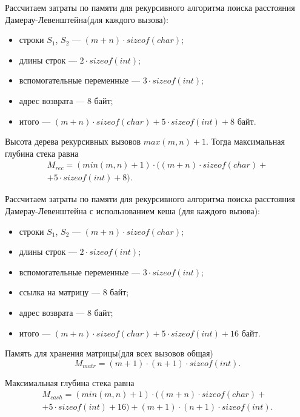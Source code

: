 Рассчитаем затраты по памяти для рекурсивного алгоритма поиска расстояния Дамерау-Левенштейна(для каждого вызова):
\begin{itemize}
	\item строки $S_1$, $S_2$ --- $(m + n) \cdot sizeof(char)$;
	\item длины строк --- $2 \cdot sizeof(int)$;
	\item вспомогательные переменные --- $3 \cdot sizeof(int)$;
	\item адрес возврата --- $8$ байт;
	\item итого --- $(m + n) \cdot sizeof(char) + 5 \cdot sizeof(int) + 8$ байт.
\end{itemize}

Высота дерева рекурсивных вызовов $max(m, n) + 1$. Тогда максимальная глубина стека равна 
\begin{equation}
	\begin{gathered}
		M_{rec} = (min(m, n) + 1) \cdot ((m + n) \cdot sizeof(char) + \\
		+ 5 \cdot sizeof(int) + 8).
	\end{gathered}
\end{equation}

Рассчитаем затраты по памяти для рекурсивного алгоритма поиска расстояния Дамерау-Левенштейна с использованием кеша (для каждого вызова): 
\begin{itemize}
	\item строки $S_1$, $S_2$ --- $(m + n) \cdot sizeof(char)$;
	\item длины строк --- $2 \cdot sizeof(int)$;
	\item вспомогательные переменные ---  $3 \cdot sizeof(int)$;
	\item ссылка на матрицу --- $8$ байт;
	\item адрес возврата --- $8$ байт;
	\item итого --- $(m + n) \cdot sizeof(char) + 5 \cdot sizeof(int) + 16$ байт.
\end{itemize}

Память для хранения матрицы(для всех вызовов общая)
\begin{equation}
	M_{matr} = (m + 1) \cdot (n + 1) \cdot sizeof(int).
\end{equation}

Максимальная глубина стека равна
\begin{equation}
	\begin{gathered}
	M_{cash} = (min(m, n) + 1) \cdot ((m + n) \cdot sizeof(char) + \\
	+ 5 \cdot sizeof(int) + 16) + (m + 1) \cdot (n + 1) \cdot sizeof(int).
	\end{gathered}
\end{equation}


